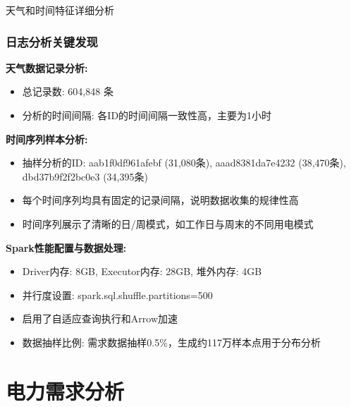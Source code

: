 \documentclass{beamer} %
\begin{document}
\begin{frame}{天气和时间特征详细分析}
    \frametitle{日志分析关键发现}
    \textbf{天气数据记录分析:}
    \begin{itemize}
        \item 总记录数: 604,848 条
        \item 分析的时间间隔: 各ID的时间间隔一致性高，主要为1小时
    \end{itemize}

    \textbf{时间序列样本分析:}
    \begin{itemize}
        \item 抽样分析的ID: aab1f0df961afebf (31,080条), aaad8381da7e4232 (38,470条), dbd37b9f2f2bc0e3 (34,395条)
        \item 每个时间序列均具有固定的记录间隔，说明数据收集的规律性高
        \item 时间序列展示了清晰的日/周模式，如工作日与周末的不同用电模式
    \end{itemize}

    \textbf{Spark性能配置与数据处理:}
    \begin{itemize}
        \item Driver内存: 8GB, Executor内存: 28GB, 堆外内存: 4GB
        \item 并行度设置: spark.sql.shuffle.partitions=500
        \item 启用了自适应查询执行和Arrow加速
        \item 数据抽样比例: 需求数据抽样0.5\%，生成约117万样本点用于分布分析
    \end{itemize}
\end{frame}

\section{电力需求分析}
\end{document}
